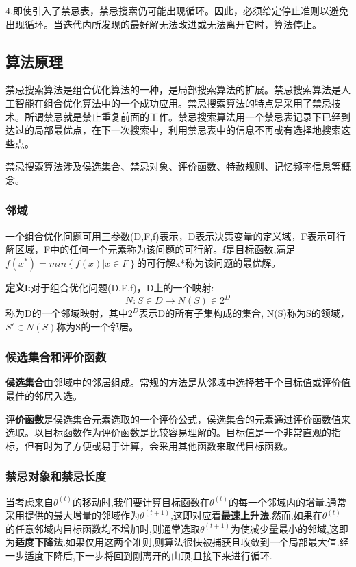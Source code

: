 \documentclass[11pt,a4paper,oneside]{book}
\begin{document}
4.即使引入了禁忌表，禁忌搜索仍可能出现循环。因此，必须给定停止准则以避免出现循环。当迭代内所发现的最好解无法改进或无法离开它时，算法停止。

\subsection{算法原理}

禁忌搜索算法是组合优化算法的一种，是局部搜索算法的扩展。禁忌搜索算法是人工智能在组合优化算法中的一个成功应用。禁忌搜索算法的特点是采用了禁忌技术。所谓禁忌就是禁止重复前面的工作。禁忌搜索算法用一个禁忌表记录下已经到达过的局部最优点，在下一次搜索中，利用禁忌表中的信息不再或有选择地搜索这些点。

禁忌搜索算法涉及侯选集合、禁忌对象、评价函数、特赦规则、记忆频率信息等概念。

\subsubsection{邻域}

一个组合优化问题可用三参数(D,F,f)表示，D表示决策变量的定义域，F表示可行解区域，F中的任何一个元素称为该问题的可行解。f是目标函数,满足$f(x^*)=min\left\lbrace f(x)|x\in F\right\rbrace  $的可行解x*称为该问题的最优解。

\textbf{定义l:}对于组合优化问题(D,F,f)，D上的一个映射:
$$ N:S\in D\rightarrow N(S)\in 2^D $$称为D的一个邻域映射，其中$ 2^D $表示D的所有子集构成的集合, N(S)称为S的领域，$ S'\in N(S) $称为S的一个邻居。

\subsubsection{候选集合和评价函数}

\textbf{侯选集合}由邻域中的邻居组成。常规的方法是从邻域中选择若干个目标值或评价值最佳的邻居入选。

\textbf{评价函数}是侯选集合元素选取的一个评价公式，侯选集合的元素通过评价函数值来选取。以目标函数作为评价函数是比较容易理解的。目标值是一个非常直观的指标，但有时为了方便或易于计算，会采用其他函数来取代目标函数。

\subsubsection{禁忌对象和禁忌长度}
当考虑来自$ \theta^{(t)} $的移动时,我们要计算目标函数在$ \theta^{(t)} $的每一个邻域内的增量.通常采用提供的最大增量的邻域作为$ \theta^{(t+1)} $,这即对应着\textbf{最速上升法}.然而,如果在$ \theta^{(t)} $的任意邻域内目标函数均不增加时,则通常选取$ \theta^{(t+1)} $为使减少量最小的邻域,这即为\textbf{适度下降法}.如果仅用这两个准则,则算法很快被捕获且收敛到一个局部最大值.经一步适度下降后,下一步将回到刚离开的山顶,且接下来进行循环.
\end{document}
